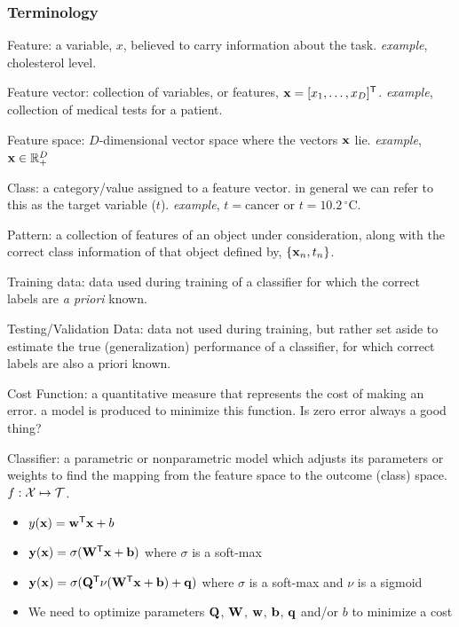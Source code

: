 \documentclass[aspectratio=169,xcolor=dvipsnames,svgnames,x11names,fleqn]{beamer}
\begin{document}
 \begin{frame}
   \frametitle{\bf Terminology}
   \begin{itemize}
  {    \item {\color{MediumBlue}Feature}: a variable, $x$, believed to carry information about the task. {\em example}, cholesterol level.}

  {    \item {\color{MediumBlue}Feature vector}: collection of variables, or features, ${\mathbf x} = [x_1,\ldots,x_D]^{\textsf{T}}$. {\em example}, collection of medical tests for a patient.}

   {   \item {\color{MediumBlue}Feature space}: $D$-dimensional vector space where the vectors ${\mathbf x}$ lie. {\em example}, ${\mathbf x} \in {\mathbb R}_+^D$}
 
   {   \item {\color{MediumBlue}Class}: a category/value assigned to a feature vector. in general we can refer to this as the target variable ($t$). {\em example}, $t = \textrm{cancer}$ or $t = 10.2\,^{\circ}\mathrm{C}$.}
 
  {    \item {\color{MediumBlue}Pattern}: a collection of features of an object under consideration, along with the correct class information of that object defined by, $\{{\mathbf x}_n,t_n\}$.}

   {   \item {\color{MediumBlue}Training data}: data used during training of a classifier for which the correct labels are {\em a priori} known.}
 
   {   \item {\color{MediumBlue}Testing/Validation Data}: data not used during training, but rather set aside to estimate the true  (generalization) performance of a classifier, for which correct labels are also a priori known.}
 
   {   \item {\color{MediumBlue}Cost Function}: a quantitative measure that represents the cost of making an error. a model is produced to minimize this function. Is zero error always a good thing?}
 
   {   \item {\color{MediumBlue}Classifier}: a parametric or nonparametric model which adjusts its parameters or weights to find the mapping from the feature space to the outcome (class) space. $f: {\mathcal X} \mapsto {\mathcal T}$. 
       \begin{itemize}
         \item $y({\mathbf x}) = {\mathbf w}^{\textsf{T}}{\mathbf x} + b$
         \item ${\mathbf y}({\mathbf x}) = \sigma({\mathbf W}^{\textsf{T}} {\mathbf x} + {\mathbf b})$ where $\sigma$ is a soft-max
         \item ${\mathbf y}({\mathbf x}) = \sigma( {\mathbf Q}^{\textsf{T}}\nu({\mathbf W}^{\textsf{T}} {\mathbf x} + {\mathbf b}) +{\mathbf q} )$ where $\sigma$ is a soft-max and $\nu$ is a sigmoid
         \item We need to optimize parameters ${\mathbf Q}$, ${\mathbf W}$, ${\mathbf w}$, ${\mathbf b}$, ${\mathbf q}$ and/or $b$ to minimize a cost 
       \end{itemize}}
      

\end{itemize}
\end{frame}
\end{document}
